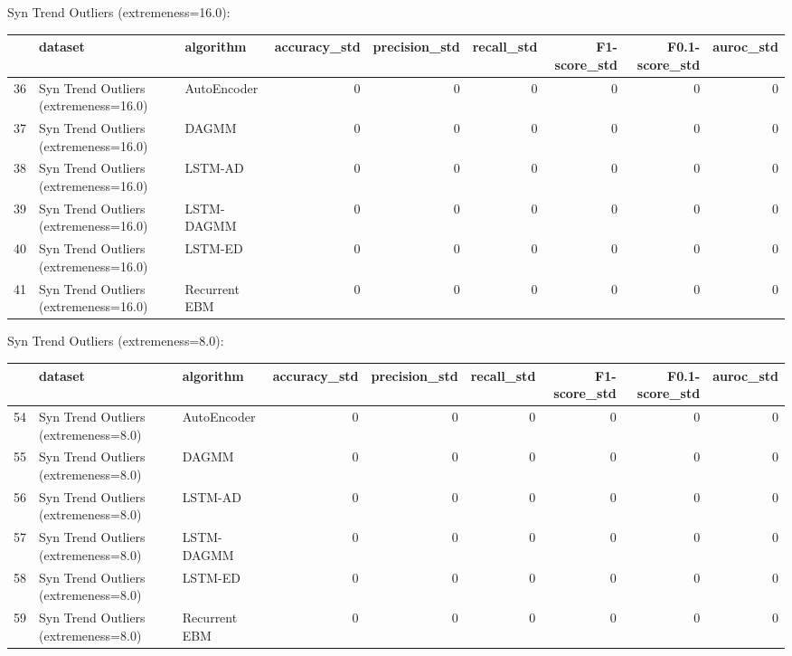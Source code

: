 Syn Trend Outliers (extremeness=16.0):

\begin{tabular}{rllrrrrrr}
\hline
    & dataset                               & algorithm     &   accuracy\_std &   precision\_std &   recall\_std &   F1-score\_std &   F0.1-score\_std &   auroc\_std \\
\hline
 36 & Syn Trend Outliers (extremeness=16.0) & AutoEncoder   &              0 &               0 &            0 &              0 &                0 &           0 \\
 37 & Syn Trend Outliers (extremeness=16.0) & DAGMM         &              0 &               0 &            0 &              0 &                0 &           0 \\
 38 & Syn Trend Outliers (extremeness=16.0) & LSTM-AD       &              0 &               0 &            0 &              0 &                0 &           0 \\
 39 & Syn Trend Outliers (extremeness=16.0) & LSTM-DAGMM    &              0 &               0 &            0 &              0 &                0 &           0 \\
 40 & Syn Trend Outliers (extremeness=16.0) & LSTM-ED       &              0 &               0 &            0 &              0 &                0 &           0 \\
 41 & Syn Trend Outliers (extremeness=16.0) & Recurrent EBM &              0 &               0 &            0 &              0 &                0 &           0 \\
\hline
\end{tabular}

Syn Trend Outliers (extremeness=8.0):

\begin{tabular}{rllrrrrrr}
\hline
    & dataset                              & algorithm     &   accuracy\_std &   precision\_std &   recall\_std &   F1-score\_std &   F0.1-score\_std &   auroc\_std \\
\hline
 54 & Syn Trend Outliers (extremeness=8.0) & AutoEncoder   &              0 &               0 &            0 &              0 &                0 &           0 \\
 55 & Syn Trend Outliers (extremeness=8.0) & DAGMM         &              0 &               0 &            0 &              0 &                0 &           0 \\
 56 & Syn Trend Outliers (extremeness=8.0) & LSTM-AD       &              0 &               0 &            0 &              0 &                0 &           0 \\
 57 & Syn Trend Outliers (extremeness=8.0) & LSTM-DAGMM    &              0 &               0 &            0 &              0 &                0 &           0 \\
 58 & Syn Trend Outliers (extremeness=8.0) & LSTM-ED       &              0 &               0 &            0 &              0 &                0 &           0 \\
 59 & Syn Trend Outliers (extremeness=8.0) & Recurrent EBM &              0 &               0 &            0 &              0 &                0 &           0 \\
\hline
\end{tabular}

